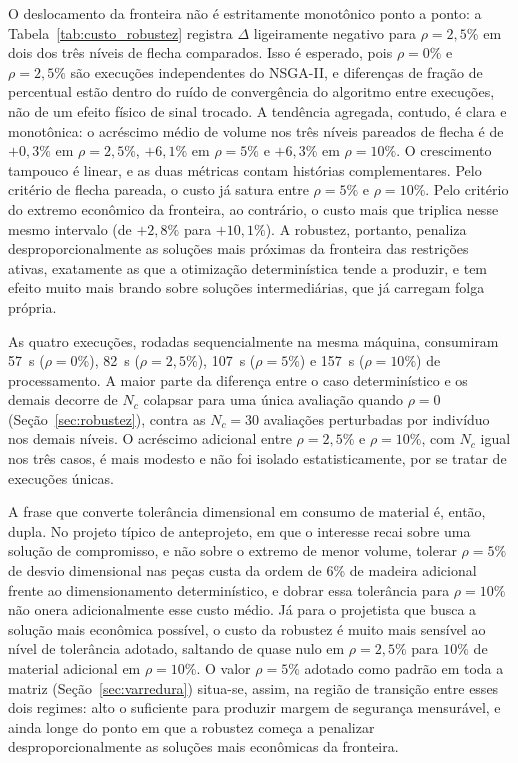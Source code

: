 O deslocamento da fronteira não é estritamente monotônico ponto a ponto: a Tabela~\ref{tab:custo_robustez} registra $\Delta$ ligeiramente negativo para $\rho = 2{,}5\%$ em dois dos três níveis de flecha comparados. Isso é esperado, pois $\rho = 0\%$ e $\rho = 2{,}5\%$ são execuções independentes do NSGA-II, e diferenças de fração de percentual estão dentro do ruído de convergência do algoritmo entre execuções, não de um efeito físico de sinal trocado.
A tendência agregada, contudo, é clara e monotônica: o acréscimo médio de volume nos três níveis pareados de flecha é de $+0{,}3\%$ em $\rho = 2{,}5\%$, $+6{,}1\%$ em $\rho = 5\%$ e $+6{,}3\%$ em $\rho = 10\%$.
O crescimento tampouco é linear, e as duas métricas contam histórias complementares. Pelo critério de flecha pareada, o custo já satura entre $\rho = 5\%$ e $\rho = 10\%$. Pelo critério do extremo econômico da fronteira, ao contrário, o custo mais que triplica nesse mesmo intervalo (de $+2{,}8\%$ para $+10{,}1\%$).
A robustez, portanto, penaliza desproporcionalmente as soluções mais próximas da fronteira das restrições ativas, exatamente as que a otimização determinística tende a produzir, e tem efeito muito mais brando sobre soluções intermediárias, que já carregam folga própria.

As quatro execuções, rodadas sequencialmente na mesma máquina, consumiram 57~s ($\rho = 0\%$), 82~s ($\rho = 2{,}5\%$), 107~s ($\rho = 5\%$) e 157~s ($\rho = 10\%$) de processamento.
A maior parte da diferença entre o caso determinístico e os demais decorre de $N_c$ colapsar para uma única avaliação quando $\rho = 0$ (Seção~\ref{sec:robustez}), contra as $N_c = 30$ avaliações perturbadas por indivíduo nos demais níveis. O acréscimo adicional entre $\rho = 2{,}5\%$ e $\rho = 10\%$, com $N_c$ igual nos três casos, é mais modesto e não foi isolado estatisticamente, por se tratar de execuções únicas.

A frase que converte tolerância dimensional em consumo de material é, então, dupla.
No projeto típico de anteprojeto, em que o interesse recai sobre uma solução de compromisso, e não sobre o extremo de menor volume, tolerar $\rho = 5\%$ de desvio dimensional nas peças custa da ordem de 6\% de madeira adicional frente ao dimensionamento determinístico, e dobrar essa tolerância para $\rho = 10\%$ não onera adicionalmente esse custo médio.
Já para o projetista que busca a solução mais econômica possível, o custo da robustez é muito mais sensível ao nível de tolerância adotado, saltando de quase nulo em $\rho = 2{,}5\%$ para $10\%$ de material adicional em $\rho = 10\%$.
O valor $\rho = 5\%$ adotado como padrão em toda a matriz (Seção~\ref{sec:varredura}) situa-se, assim, na região de transição entre esses dois regimes: alto o suficiente para produzir margem de segurança mensurável, e ainda longe do ponto em que a robustez começa a penalizar desproporcionalmente as soluções mais econômicas da fronteira.

